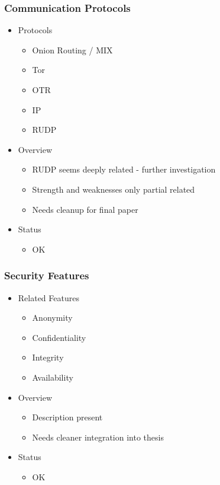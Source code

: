 \documentclass{beamer}
\begin{document}
\frame
{
  \frametitle{Communication Protocols}
  \begin{itemize}
      \item Protocols
      \begin{itemize}
          \item Onion Routing / MIX
          \item Tor
          \item OTR
          \item IP
          \item RUDP
      \end{itemize}
      \item Overview
      \begin{itemize}
          \item RUDP seems deeply related - further investigation
          \item Strength and weaknesses only partial related
          \item Needs cleanup for final paper
      \end{itemize}
      \item Status
      \begin{itemize}
          \item OK
      \end{itemize}
  \end{itemize}
}

\frame
{
  \frametitle{Security Features}
  \begin{itemize}
      \item Related Features
      \begin{itemize}
          \item Anonymity
          \item Confidentiality
          \item Integrity
          \item Availability
      \end{itemize}
      \item Overview
      \begin{itemize}
          \item Description present
          \item Needs cleaner integration into thesis
      \end{itemize}
      \item Status
      \begin{itemize}
          \item OK
      \end{itemize}
  \end{itemize}
}
\end{document}
